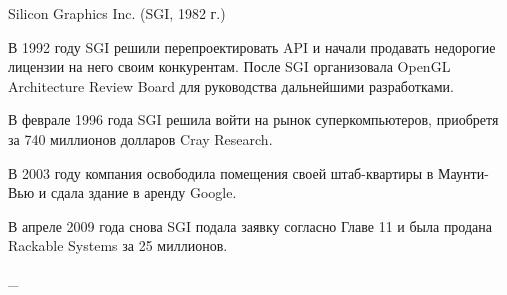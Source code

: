 \documentclass{beamer}
\begin{document}
\begin{frame}{Silicon Graphics Inc. (SGI, 1982 г.)}{}
{{		В 1992 году SGI решили перепроектировать API и начали продавать недорогие лицензии на него своим конкурентам.
		После SGI организовала OpenGL Architecture Review Board для руководства дальнейшими разработками.

		В феврале 1996 года SGI решила войти на рынок суперкомпьютеров, приобретя за 740 миллионов долларов Cray Research.

		В 2003 году компания освободила помещения своей штаб-квартиры в Маунти-Вью и сдала здание в аренду Google.

		В апреле 2009 года снова SGI подала заявку согласно Главе 11 и была продана Rackable Systems за 25 миллионов.
		
		\_
		
		}
	}

\end{frame}
\end{document}

